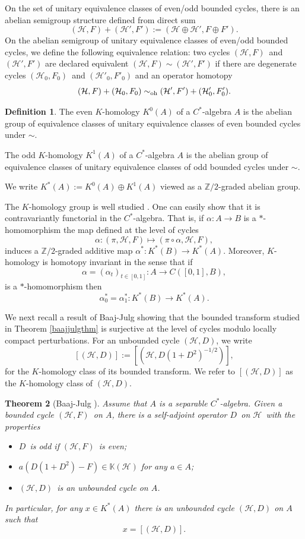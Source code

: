 \documentclass[a4paper,reqno]{amsart}
\numberwithin{equation}{section}
\def\Z{\mathbb{Z}}
\newtheorem{thm}{Theorem}[section]
\theoremstyle{definition}
\newtheorem{definition}[thm]{Definition}
\theoremstyle{remark}
\begin{document}
On the set of unitary equivalence classes of even/odd bounded cycles, there is an abelian semigroup structure defined from direct sum
$$(\mathcal{H},F)+(\mathcal{H}',F'):=(\mathcal{H}\oplus \mathcal{H}',F\oplus F').$$ 
On the abelian semigroup of unitary equivalence classes of even/odd bounded cycles, we define the following equivalence relation: two cycles $(\mathcal{H},F)$ and $(\mathcal{H}',F')$ are declared equivalent $(\mathcal{H},F)\sim (\mathcal{H}',F')$ if there are degenerate cycles $(\mathcal{H}_0,F_0)$ and $(\mathcal{H}'_0,F'_0)$ and an operator homotopy 
$$(\mathcal{H},F)+ (\mathcal{H}_0,F_0)\sim_{\rm oh} (\mathcal{H}',F')+ (\mathcal{H}_0',F_0').$$  


\begin{definition}
The even $K$-homology $K^0(A)$ of a $C^*$-algebra $A$ is the abelian group of equivalence classes of unitary equivalence classes of even bounded cycles under $\sim$.
 
The odd $K$-homology $K^1(A)$ of a $C^*$-algebra $A$ is the abelian group of equivalence classes of unitary equivalence classes of odd bounded cycles under $\sim$.


We write $K^*(A):=K^0(A)\oplus K^1(A)$ viewed as a $\Z/2$-graded abelian group.
\end{definition}


The $K$-homology group is well studied \cite{Blackadar, higsonroe, knudsenjensen}. One can easily show that it is contravariantly functorial in the $C^*$-algebra. That is, if $\alpha:A\to B$ is a $*$-homomorphism the map defined at the level of cycles 
$$\alpha:(\pi,\mathcal{H},F)\mapsto (\pi\circ \alpha,\mathcal{H},F),$$
induces a $\Z/2$-graded additive map $\alpha^*:K^*(B)\to K^*(A)$. Moreover, $K$-homology is homotopy invariant in the sense that if 
$$\alpha=(\alpha_t)_{t\in [0,1]}:A\to C([0,1],B),$$
is a $*$-homomorphism then 
$$\alpha_0^*=\alpha_1^*:K^*(B)\to K^*(A).$$


We next recall a result of Baaj-Julg showing that the bounded transform studied in Theorem \ref{baajjulgthm} is surjective at the level of cycles modulo locally compact perturbations. For an unbounded cycle $(\mathcal{H},D)$, we write 
$$[(\mathcal{H},D)]:=[(\mathcal{H},D(1+D^2)^{-1/2})],$$
for the $K$-homology class of its bounded transform. We refer to $[(\mathcal{H},D)]$ as  the $K$-homology class of $(\mathcal{H},D)$.


\begin{thm}[Baaj-Julg \cite{baajjulg}]
\label{baajjulgthm2}
Assume that $A$ is a separable $C^*$-algebra. Given a bounded cycle $(\mathcal{H},F)$ on $A$, there is a self-adjoint operator $D$ on $\mathcal{H}$ with the properties
\begin{itemize}
\item $D$ is odd if $(\mathcal{H},F)$ is even;
\item $a(D(1+D^2)-F)\in \mathbb{K}(\mathcal{H})$ for any $a\in A$;
\item $(\mathcal{H},D)$ is an unbounded cycle on $A$.
\end{itemize}
In particular, for any $x\in K^*(A)$ there is an unbounded cycle $(\mathcal{H},D)$ on $A$ such that 
$$x=[(\mathcal{H},D)].$$
\end{thm}
\end{document}
